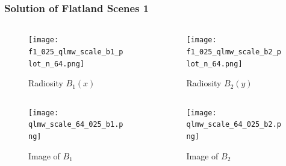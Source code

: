     \begin{frame}\frametitle{Solution of Flatland Scenes 1}
    \vspace{-7 mm}
        
        \begin{columns}[T]
          \begin{column}{.4\textwidth}
      
              \begin{figure}
              \centering
              \texttt{[image: f1\_025\_qlmw\_scale\_b1\_plot\_n\_64.png]}
              \caption{Radiosity $B_1(x)$}
              \label{fig_gen_kernel_2D}
              \end{figure}
        \end{column}

        \begin{column}{.5\textwidth}
              \begin{figure}
              \centering
              \texttt{[image: f1\_025\_qlmw\_scale\_b2\_plot\_n\_64.png]}
              \caption{Radiosity $B_2(y)$}
              \label{fig_gen_kernel_2D}
              \end{figure}
        \end{column}
      \end{columns}
        \begin{columns}[T]
          \begin{column}{.4\textwidth}
      
              \begin{figure}
              \centering
              \texttt{[image: qlmw\_scale\_64\_025\_b1.png]}
              \caption{Image of $B_1$}
              \label{fig_gen_kernel_2D}
              \end{figure}
        \end{column}

        \begin{column}{.5\textwidth}

                \begin{figure}
              \centering
              \texttt{[image: qlmw\_scale\_64\_025\_b2.png]}
              \caption{Image of $B_2$}
              \label{fig_gen_kernel_2D}
              \end{figure}
        \end{column}
      \end{columns}


    \end{frame}

